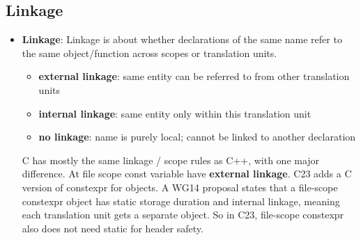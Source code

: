 \documentclass{report}
\begin{document}
        \subsection{Linkage}
        \begin{itemize}
            \item \textbf{Linkage}: Linkage is about whether declarations of the same name refer to the same object/function across scopes or translation units.
                \begin{itemize}
                    \item \textbf{external linkage}:   same entity can be referred to from other translation units
                    \item \textbf{internal linkage}:   same entity only within this translation unit
                    \item \textbf{no linkage}:         name is purely local; cannot be linked to another declaration
                \end{itemize}
                C has mostly the same linkage / scope rules as C++, with one major difference. At file scope const variable have \textbf{external linkage}.
                \bigbreak \noindent 
                C23 adds a C version of constexpr for objects. A WG14 proposal states that a file-scope constexpr object has static storage duration and internal linkage, meaning each translation unit gets a separate object. So in C23, file-scope constexpr also does not need static for header safety.
        \end{itemize}

        \pagebreak 
\end{document}

